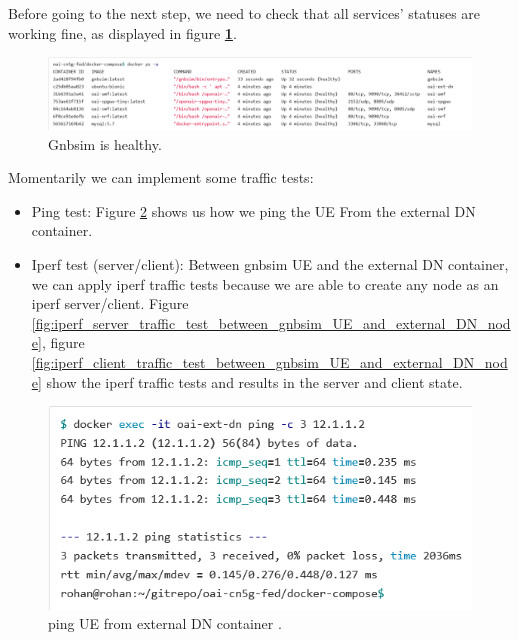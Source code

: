 Before going to the next step, we need to check that all services' statuses are working fine, as displayed in figure \textbf{\ref{fig:gnbsim_is_healthy}}. 


\begin{figure}
\centering
\includegraphics[scale=0.24]{images/gnbsim_is_healthy.png}
\caption{Gnbsim is healthy\cite{openairinterface2014}.}
\label{fig:gnbsim_is_healthy}
\end{figure}
     
     
Momentarily we can implement some traffic tests:
\begin{itemize}
    \item Ping test: Figure \ref{fig:ping_UE_from_external_DN_container} shows us how we ping the UE From the external DN container.
      \item  Iperf test (server/client): 
Between gnbsim UE and the external DN container, we can apply iperf traffic tests because we are able to create any node as an iperf server/client. Figure \ref{fig:iperf_server_traffic_test_between_gnbsim_UE_and_external_DN_node}, figure \ref{fig:iperf_client_traffic_test_between_gnbsim_UE_and_external_DN_node} show the iperf traffic tests and results in the server and client state.
\end{itemize}
   
\begin{figure}
\centering
\includegraphics[scale=0.50]{images/ping_UE_from_external_DN_container.png}
\caption{ping UE from external DN container \cite{openairinterface2014}.}
\label{fig:ping_UE_from_external_DN_container}
\end{figure}
 
